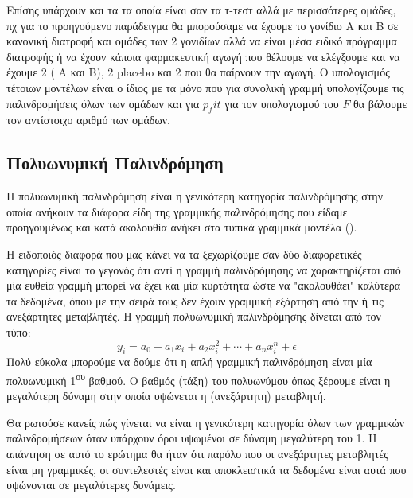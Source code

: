 Επίσης υπάρχουν και τα  τα οποία είναι σαν τα τ-τεστ αλλά με περισσότερες ομάδες, πχ για το προηγούμενο
παράδειγμα θα μπορούσαμε να έχουμε το γονίδιο Α και Β σε κανονική διατροφή και ομάδες
των 2 γονιδίων αλλά να είναι μέσα ειδικό πρόγραμμα διατροφής ή να έχουν κάποια
φαρμακευτική αγωγή που θέλουμε να ελέγξουμε και να έχουμε 2 ( A και B), 2
placebo και 2 που θα παίρνουν την αγωγή. Ο υπολογισμός τέτοιων μοντέλων είναι ο ίδιος με
τα  μόνο που για συνολική γραμμή υπολογίζουμε τις παλινδρομήσεις όλων των ομάδων
και για $p_fit$ για τον υπολογισμού του $F$ θα βάλουμε τον αντίστοιχο αριθμό των ομάδων.
\subsection{Πολυωνυμική Παλινδρόμηση}
Η πολυωνυμική παλινδρόμηση είναι η γενικότερη κατηγορία παλινδρόμησης στην οποία
ανήκουν τα διάφορα είδη της γραμμικής παλινδρόμησης που είδαμε προηγουμένως και κατά
ακολουθία ανήκει στα τυπικά γραμμικά μοντέλα ().

Η ειδοποιός
διαφορά που μας κάνει να τα ξεχωρίζουμε σαν δύο διαφορετικές κατηγορίες είναι το γεγονός
ότι αντί η γραμμή παλινδρόμησης να χαρακτηρίζεται από μία ευθεία γραμμή μπορεί να έχει
και μία κυρτότητα ώστε να "ακολουθάει" καλύτερα τα δεδομένα, όπου με την σειρά τους δεν
έχουν γραμμική εξάρτηση από την ή τις ανεξάρτητες μεταβλητές. Η γραμμή πολυωνυμική
παλινδρόμησης δίνεται από τον τύπο:
$$y_i=a_0+a_1x_i+a_2x_i^2+\cdots +a_nx_i^n+\epsilon$$
Πολύ εύκολα μπορούμε να δούμε ότι η απλή γραμμική παλινδρόμηση είναι μία πολυωνυμική
1\textsuperscript{ου} βαθμού. Ο βαθμός (τάξη) του πολυωνύμου όπως ξέρουμε είναι η μεγαλύτερη δύναμη
στην οποία υψώνεται η (ανεξάρτητη) μεταβλητή.

Θα ρωτούσε κανείς πώς γίνεται να είναι η
γενικότερη κατηγορία όλων των γραμμικών παλινδρομήσεων όταν υπάρχουν όροι υψωμένοι
σε δύναμη μεγαλύτερη του 1. Η απάντηση σε αυτό το ερώτημα θα ήταν ότι παρόλο που οι
ανεξάρτητες μεταβλητές είναι μη γραμμικές, οι συντελεστές είναι και αποκλειστικά
τα δεδομένα είναι αυτά που υψώνονται σε μεγαλύτερες δυνάμεις.

